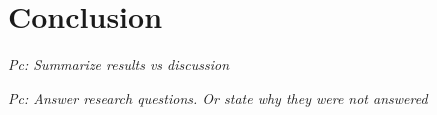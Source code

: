 \section{Conclusion}

\textit{Pc: Summarize results vs discussion}

\textit{Pc: Answer research questions. Or state why they were not answered}